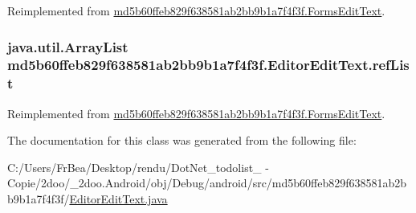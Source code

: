 Reimplemented from \hyperlink{classmd5b60ffeb829f638581ab2bb9b1a7f4f3f_1_1_forms_edit_text_2cbb395bc194ab641c62a79e13d6705f}{md5b60ffeb829f638581ab2bb9b1a7f4f3f.FormsEditText}.\hypertarget{classmd5b60ffeb829f638581ab2bb9b1a7f4f3f_1_1_editor_edit_text_c9c34d4a7a109014d9c3e0fcb9d24cd4}{
\subsubsection[{refList}]{\setlength{\rightskip}{0pt plus 5cm}java.util.ArrayList {\bf md5b60ffeb829f638581ab2bb9b1a7f4f3f.EditorEditText.refList}}}
\label{classmd5b60ffeb829f638581ab2bb9b1a7f4f3f_1_1_editor_edit_text_c9c34d4a7a109014d9c3e0fcb9d24cd4}




Reimplemented from \hyperlink{classmd5b60ffeb829f638581ab2bb9b1a7f4f3f_1_1_forms_edit_text_e4cf7e6b7330b3bf927c0a23059cf810}{md5b60ffeb829f638581ab2bb9b1a7f4f3f.FormsEditText}.

The documentation for this class was generated from the following file:\begin{CompactItemize}
\item 
C:/Users/FrBea/Desktop/rendu/DotNet\_\-todolist\_ - Copie/2doo/\_\-2doo.Android/obj/Debug/android/src/md5b60ffeb829f638581ab2bb9b1a7f4f3f/\hyperlink{_editor_edit_text_8java}{EditorEditText.java}\end{CompactItemize}
